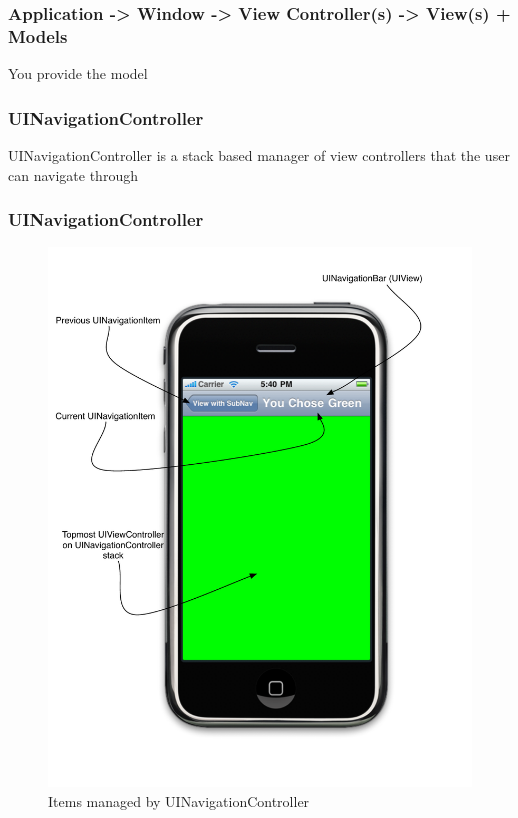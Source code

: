 \documentclass[10pt]{beamer}
\begin{document}
\begin{frame}[fragile]
  \frametitle{Application -> Window -> View Controller(s) -> View(s) + Models}
  You provide the model

\end{frame}

    
\begin{frame}[fragile]
  \frametitle{UINavigationController}
  UINavigationController is a stack based manager of view controllers that the user can navigate through

\end{frame}

\begin{frame}[fragile]
  \frametitle{UINavigationController}
  \begin{figure}[htb]
  \begin{center}
  
  \includegraphics[scale=0.35]{UIViewExample3.pdf}
              
  \caption{Items managed by UINavigationController }
  \end{center}
  \end{figure}

\end{frame}
\end{document}
